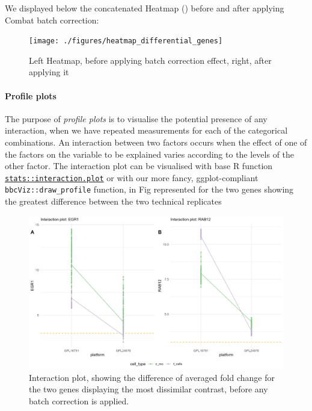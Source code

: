 We displayed below the concatenated Heatmap () before and after applying Combat batch correction:

\begin{figure}

{\centering \texttt{[image: ./figures/heatmap\_differential\_genes]} 

}

\caption{Left Heatmap, before applying batch correction effect, right, after applying it}
\label{fig:complex-heatmap}
\end{figure}


\paragraph{Profile plots}
\label{profile-plots}

The purpose of \emph{profile plots} is to visualise the potential presence of any interaction, when we have repeated measurements for each of the categorical combinations. An interaction between two factors occurs when the effect of one of the factors on the variable to be explained varies according to the levels of the other factor. The interaction plot can be visualised with base R function \href{https://rdrr.io/r/stats/interaction.plot.html}{\texttt{stats::interaction.plot}} or with our more fancy, ggplot-compliant \texttt{bbcViz::draw\_profile} function, in Fig  represented for the two genes showing the greatest difference between the two technical replicates 

\begin{figure}

{\centering \includegraphics[width=0.6\linewidth]{./figures/global_profile_plot} 

}

\caption{Interaction plot, showing the difference of averaged fold change for the two genes displaying the most dissimilar contrast, before any batch correction is applied.}
\label{fig:interaction-plot}
\end{figure}


